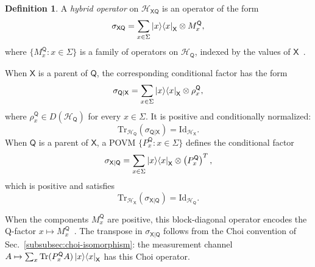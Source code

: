 \documentclass[
    aps,
    pra,
    reprint,
    superscriptaddress,
    nofootinbib
]{revtex4-2}
\theoremstyle{definition}
\newtheorem{definition}{Definition}[section]
\theoremstyle{plain}
\begin{document}
\begin{definition}
    \label{def:hybrid-operator}
    A \emph{hybrid operator} on
    $\mathcal{H}_{\mathsf{X}\mathsf{Q}}$ is an operator of the form
    \begin{equation}
        \sigma_{\mathsf{X}\mathsf{Q}}
        =
        \sum_{x\in\Sigma}
        \ket{x}\!\bra{x}_{\mathsf{X}}
        \otimes
        M_x^{\mathsf{Q}},
    \end{equation}
    where $\{M_x^{\mathsf{Q}}:x\in\Sigma\}$ is a family of operators
    on $\mathcal{H}_{\mathsf{Q}}$, indexed by the values of
    $\mathsf{X}$~\cite[Def.~III.10]{LeiferSpekkens2013}.

    When $\mathsf{X}$ is a parent of $\mathsf{Q}$, the corresponding
    conditional factor has the form
    \begin{equation}
        \sigma_{\mathsf{Q}|\mathsf{X}}
        =
        \sum_{x\in\Sigma}
        \ket{x}\!\bra{x}_{\mathsf{X}}
        \otimes
        \rho_x^{\mathsf{Q}},
    \end{equation}
    where $\rho_x^{\mathsf{Q}}\in D(\mathcal{H}_{\mathsf{Q}})$ for every
    $x\in\Sigma$. It is positive and conditionally normalized:
    \begin{equation}
        \mathrm{Tr}_{\mathcal{H}_{\mathsf{Q}}}
        \left(\sigma_{\mathsf{Q}|\mathsf{X}}\right)
        =
        \mathrm{Id}_{\mathcal{H}_{\mathsf{X}}}.
    \end{equation}
    When $\mathsf{Q}$ is a parent of $\mathsf{X}$, a POVM
    $\{P_x^{\mathsf{Q}}:x\in\Sigma\}$ defines the conditional factor
    \begin{equation}
        \sigma_{\mathsf{X}|\mathsf{Q}}
        =
        \sum_{x\in\Sigma}
        \ket{x}\!\bra{x}_{\mathsf{X}}
        \otimes
        \left(P_x^{\mathsf{Q}}\right)^{T},
    \end{equation}
    which is positive and satisfies
    \begin{equation}
        \mathrm{Tr}_{\mathcal{H}_{\mathsf{X}}}
        \left(\sigma_{\mathsf{X}|\mathsf{Q}}\right)
        =
        \mathrm{Id}_{\mathcal{H}_{\mathsf{Q}}}.
    \end{equation}
\end{definition}

When the components $M_x^{\mathsf{Q}}$ are positive, this block-diagonal
operator encodes the Q-factor
$x\mapsto M_x^{\mathsf{Q}}$~\cite[Def.~13]{DiGuardiaEhrhardFaggian2026}.
The transpose in $\sigma_{\mathsf{X}|\mathsf{Q}}$ follows from the Choi convention of
Sec.~\ref{subsubsec:choi-isomorphism}: the measurement channel
$A\mapsto\sum_x\mathrm{Tr}(P_x^{\mathsf{Q}}A)
\ket{x}\!\bra{x}_{\mathsf{X}}$ has this Choi operator.
\end{document}
